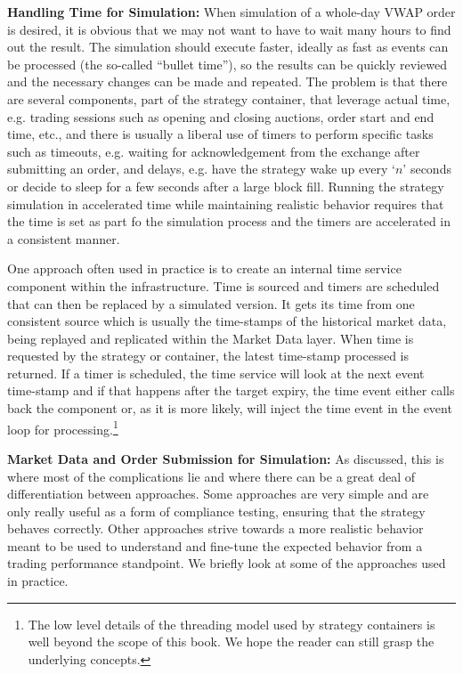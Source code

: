 \noindent\textbf{Handling Time for Simulation:}\label{in:sim_environ} When simulation of a whole-day VWAP order is desired, it is obvious that we may not want to have to wait many hours to find out the result. The simulation should execute faster, ideally as fast as events can be processed (the so-called ``bullet time''), so the results can be quickly reviewed and the necessary changes can be made and repeated. The problem is that there are several components, part of the strategy container, that leverage actual time, e.g. trading sessions such as opening and closing auctions, order start and end time, etc., and there is usually a liberal use of timers to perform specific tasks such as timeouts, e.g. waiting for acknowledgement from the exchange after submitting an order, and delays, e.g. have the strategy wake up every `$n$' seconds or decide to sleep for a few seconds after a large block fill. Running the strategy simulation in accelerated time while maintaining realistic behavior requires that the time is set as part fo the simulation process and the timers are accelerated in a consistent manner.


One approach often used in practice is to create an internal time service component within the infrastructure. Time is sourced and timers are scheduled that can then be replaced by a simulated version. It gets its time from one consistent source which is usually the time-stamps of the historical market data, being replayed and replicated within the Market Data layer. When time is requested by the strategy or container, the latest time-stamp processed is returned. If a timer is scheduled, the time service will look at the next event time-stamp and if that happens after the target expiry, the time event either calls back the component or, as it is more likely, will inject the time event in the event loop for processing.\footnote{The low level details of the threading model used by strategy containers is well beyond the scope of this book. We hope the reader can still grasp the underlying concepts.} \twomedskip


\noindent\textbf{Market Data and Order Submission for Simulation:} As discussed, this is where most of the complications lie and where there can be a great deal of differentiation between approaches. Some approaches are very simple and are only really useful as a form of compliance testing, ensuring that the strategy behaves correctly. Other approaches strive towards a more realistic behavior meant to be used to understand and fine-tune the expected behavior from a trading performance standpoint. We briefly look at some of the approaches used in practice. \twomedskip


